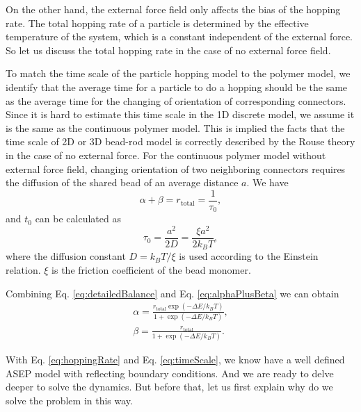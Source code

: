 On the other hand, the external force field only affects the bias of the hopping rate. The total hopping rate of a particle is determined by the effective temperature of the system, which is a constant independent of the external force. So let us discuss the total hopping rate in the case of no external force field. 

To match the time scale of the particle hopping model to the polymer model, we identify that the average time for a particle to do a hopping should be the same as the average time for the changing of orientation of corresponding connectors. Since it is hard to estimate this time scale in the 1D discrete model, we assume it is the same as the continuous polymer model. This is implied the facts that the time scale of 2D or 3D bead-rod model is correctly described by the Rouse theory in the case of no external force. For the continuous polymer model without external force field, changing orientation of two neighboring connectors requires the diffusion of the shared bead of an average distance $a$. We have
\begin{equation}
    \label{eq:alphaPlusBeta}
    \alpha + \beta = r_{\text{total}} = \frac{1}{\tau_0},
\end{equation}
and $t_0$ can be calculated as
\begin{equation}
    \label{eq:timeScale}
    \tau_0 = \frac{a^2}{2 D} = \frac{\xi a^2}{2k_{B}T},
 \end{equation}
where the diffusion constant $D = k_B T / \xi$ is used according to the Einstein relation. $\xi$ is the friction coefficient of the bead monomer. 
    
Combining Eq. \eqref{eq:detailedBalance} and Eq. \eqref{eq:alphaPlusBeta} we can obtain
\begin{subequations}
    \label{eq:hoppingRate}
    \begin{align}
        \alpha  =   \frac{r_{\text{total}}\exp{(-\Delta E / k_B T)}}{1+\exp{(- \Delta E / k_B T)}}, \\
        \beta  =  \frac{r_{\text{total}}}{1+\exp{(- \Delta E / k_B T)}}.
    \end{align}
\end{subequations}


With Eq. \eqref{eq:hoppingRate} and Eq. \eqref{eq:timeScale}, we know have a well defined ASEP model with reflecting boundary conditions. And we are ready to delve deeper to solve the dynamics. But before that, let us first explain  why do we solve the problem in this way. 

